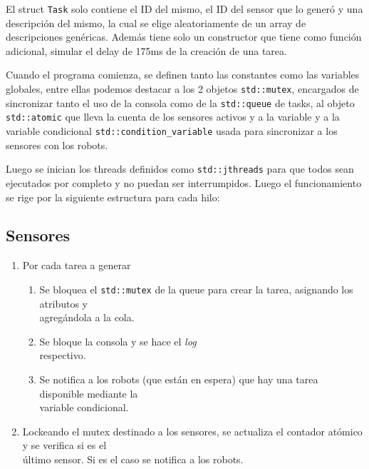 \documentclass[11pt, a4paper]{article}
\begin{document}
\begin{multicols}{2}
El struct \lstinline|Task| solo contiene el ID del mismo, el ID del sensor que lo generó y una descripción del mismo, la cual se elige aleatoriamente de un array de descripciones genéricas. Además tiene solo un constructor que tiene como función adicional, simular el delay de 175ms de la creación de una tarea.

Cuando el programa comienza, se definen tanto las constantes como las variables globales, entre ellas podemos destacar a los 2 objetos \lstinline|std::mutex|, encargados de sincronizar tanto el uso de la consola como de la \lstinline|std::queue| de tasks, al objeto \lstinline|std::atomic| que lleva la cuenta de los sensores activos y a la variable y a la variable condicional \lstinline|std::condition_variable| usada para sincronizar a los sensores con los robots.

Luego se inician los threads definidos como \lstinline|std::jthreads| para que todos sean ejecutados por completo y no puedan ser interrumpidos. Luego el funcionamiento se rige por la siguiente estructura para cada hilo:

\columnbreak

\subsection{Sensores}

\begin{enumerate}[label=\Roman*.]
    \item Por cada tarea a generar 
    \begin{enumerate}[label=\roman*.]
        \item Se bloquea el \lstinline|std::mutex| de la queue para crear la tarea, asignando los atributos y\\agregándola a la cola.
        \item Se bloque la consola y se hace el \textit{log}\\respectivo.
        \item Se notifica a los robots (que están en espera) que hay una tarea disponible mediante la\\variable condicional.
    \end{enumerate}
    \item Lockeando el mutex destinado a los sensores, se actualiza el contador atómico y se verifica si es el\\último sensor. Si es el caso se notifica a los robots.
\end{enumerate}


\end{multicols}
\end{document}
